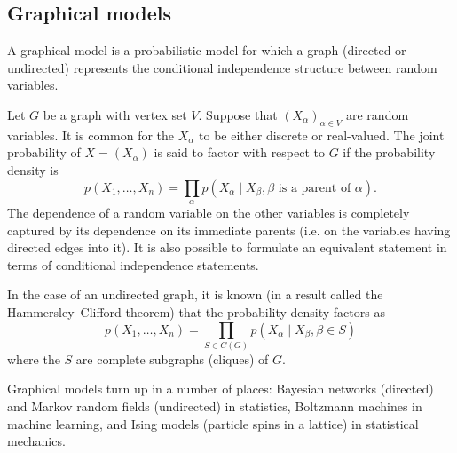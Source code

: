 \documentclass[11pt,titlepage]{article}
\numberwithin{equation}{section}
\begin{document}
\subsection{Graphical models}
    \label{sec:graph}

    A graphical model is a probabilistic model for which a graph (directed or
    undirected) represents the conditional independence structure between random
    variables. 

    Let $G$ be a graph with vertex set $V$.  Suppose that $(X_\alpha)_{\alpha
    \in V}$ are random variables.  It is common for the $X_\alpha$ to be either
    discrete or real-valued.  The joint probability of $X = (X_\alpha)$ is said
    to factor with respect to $G$ if the probability density is
    \[
        p(X_1, \ldots, X_n) = 
            \prod_\alpha p(X_\alpha \mid X_\beta, \beta \text{ is a parent of }
            \alpha).
    \]
    The dependence of a random variable on the other variables is completely
    captured by its dependence on its immediate parents (i.e. on the variables
    having directed edges into it).  It is also possible to formulate an
    equivalent statement in terms of conditional independence statements.

    In the case of an undirected graph, it is known (in a result called the
    Hammersley–Clifford theorem) that the probability density factors as
    \[
        p(X_1, \ldots, X_n) = 
            \prod_{S \in C(G)} p(X_\alpha \mid X_\beta, \beta \in S)
    \]
    where the $S$ are complete subgraphs (cliques) of $G$.

    Graphical models turn up in a number of places: Bayesian networks (directed)
    and Markov random fields (undirected) in statistics, Boltzmann machines in
    machine learning, and Ising models (particle spins in a lattice) in
    statistical mechanics.

\nocite{*}


\end{document}
